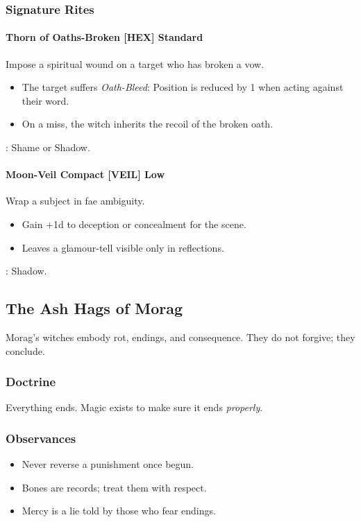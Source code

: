 \subsubsection*{Signature Rites}

\paragraph{Thorn of Oaths-Broken \hfill \textnormal{[HEX] Standard}}
Impose a spiritual wound on a target who has broken a vow.
\begin{itemize}
  \item The target suffers \emph{Oath-Bleed}: Position is reduced by 1 when acting against their word.
  \item On a miss, the witch inherits the recoil of the broken oath.
\end{itemize}
: Shame or Shadow.

\paragraph{Moon-Veil Compact \hfill \textnormal{[VEIL] Low}}
Wrap a subject in fae ambiguity.
\begin{itemize}
  \item Gain +1d to deception or concealment for the scene.
  \item Leaves a glamour-tell visible only in reflections.
\end{itemize}
: Shadow.

\subsection{The Ash Hags of Morag}
Morag's witches embody rot, endings, and consequence. They do not forgive; they conclude.

\subsubsection*{Doctrine}
Everything ends. Magic exists to make sure it ends \emph{properly}.

\subsubsection*{Observances}
\begin{itemize}
  \item Never reverse a punishment once begun.
  \item Bones are records; treat them with respect.
  \item Mercy is a lie told by those who fear endings.
\end{itemize}


